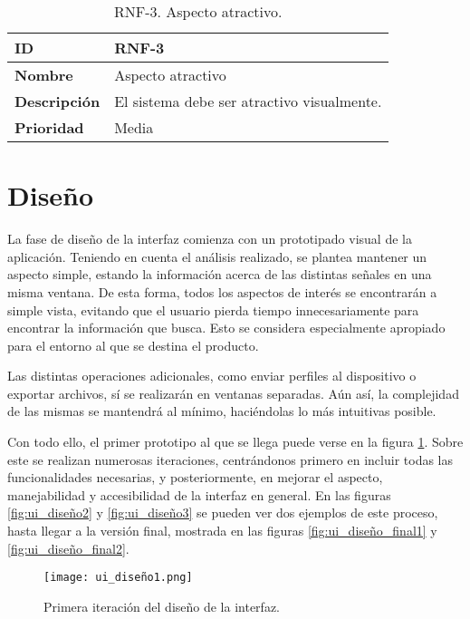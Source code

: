 \begin{table}[h!]
    \centering
    \caption{RNF-3. Aspecto atractivo.}
    \begin{tabular}{|m{2.5cm}|m{9.27cm}|}
        \hline
        \textbf{ID} & RNF-3 \\
        \hline
        \textbf{Nombre} & Aspecto atractivo \\
        \hline
        \textbf{Descripción} & El sistema debe ser atractivo visualmente. \\
        \hline
        \textbf{Prioridad} & Media \\
        \hline
    \end{tabular}
\end{table}

\section{Diseño}
\label{sec:ui_diseño}

La fase de diseño de la interfaz comienza con un prototipado visual de la aplicación. Teniendo en cuenta el análisis realizado, se plantea mantener un aspecto simple, estando la información acerca de las distintas señales en una misma ventana. De esta forma, todos los aspectos de interés se encontrarán a simple vista, evitando que el usuario pierda tiempo innecesariamente para encontrar la información que busca. Esto se considera especialmente apropiado para el entorno al que se destina el producto.

Las distintas operaciones adicionales, como enviar perfiles al dispositivo o exportar archivos, sí se realizarán en ventanas separadas. Aún así, la complejidad de las mismas se mantendrá al mínimo, haciéndolas lo más intuitivas posible.

Con todo ello, el primer prototipo al que se llega puede verse en la figura \ref{fig:ui_diseño1}. Sobre este se realizan numerosas iteraciones, centrándonos primero en incluir todas las funcionalidades necesarias, y posteriormente, en mejorar el aspecto, manejabilidad y accesibilidad de la interfaz en general. En las figuras \ref{fig:ui_diseño2} y \ref{fig:ui_diseño3} se pueden ver dos ejemplos de este proceso, hasta llegar a la versión final, mostrada en las figuras \ref{fig:ui_diseño_final1} y \ref{fig:ui_diseño_final2}.

\begin{figure}[h!]
    \centering
    \texttt{[image: ui\_diseño1.png]}
    \caption{Primera iteración del diseño de la interfaz.}
    \label{fig:ui_diseño1}
\end{figure}


